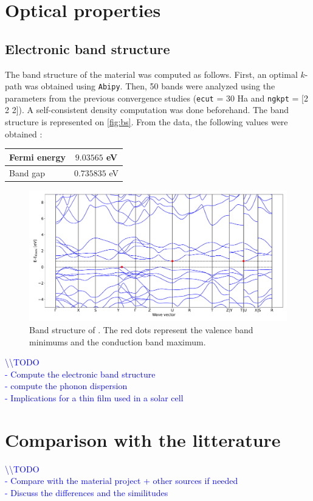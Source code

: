 \documentclass[11pt,a4paper]{article}
\begin{document}
\section{Optical properties}
\subsection{Electronic band structure}
The band structure of the material was computed as follows. First, an optimal $k$-path was obtained using \texttt{Abipy}. Then, 50 bands were analyzed using the parameters from the previous convergence studies (\texttt{ecut} = 30 Ha and \texttt{ngkpt} = [2 2 2]). A self-consistent density computation was done beforehand. The band structure is represented on \autoref{fig:bs}. From the data, the following values were obtained : 
\begin{center}
\begin{tabular}{|l|c|}
\hline
Fermi energy & $9.03565$ eV\\
\hline
Band gap & $0.735835$ eV\\
\hline
\end{tabular}
\end{center}
\begin{figure}[h]
\centering
\includegraphics[width=\textwidth]{images/bs.pdf}
\caption{Band structure of . The red dots represent the valence band minimums and the conduction band maximum.}
\label{fig:bs}
\end{figure}

\textcolor{blue}{
\textbackslash\textbackslash TODO\\
- Compute the electronic band structure\\
- compute the phonon dispersion\\
- Implications for a thin film used in a solar cell}
\newpage
\section{Comparison with the litterature}
\textcolor{blue}{
\textbackslash\textbackslash TODO\\
- Compare with the material project + other sources if needed\\
- Discuss the differences and the similitudes}
\newpage
\end{document}
